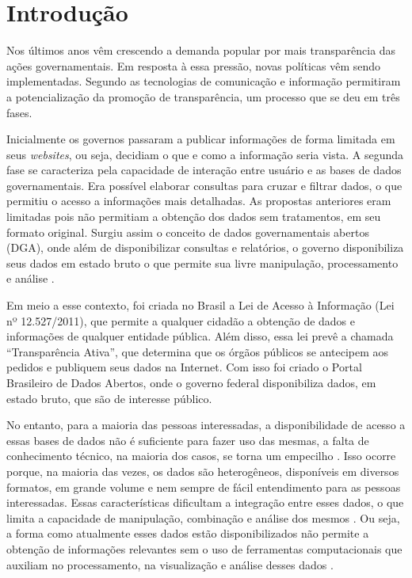 
\chapter{Introdução}
\label{chap:introducao}

Nos últimos anos vêm crescendo a demanda popular por mais transparência das ações 
governamentais. Em resposta à essa pressão, novas políticas vêm sendo implementadas. 
Segundo  as tecnologias de comunicação e informação permitiram a 
potencialização da promoção de transparência, um processo que se deu em três fases. 

Inicialmente os governos passaram a publicar informações de forma limitada em seus 
\textit{websites}, ou seja, decidiam o que e como a informação seria vista. A segunda fase 
se caracteriza pela capacidade de interação entre usuário e as bases de dados governamentais. 
Era possível elaborar consultas para cruzar e filtrar dados, o que permitiu o acesso a 
informações mais detalhadas. As propostas anteriores eram limitadas pois não permitiam a 
obtenção dos dados  sem tratamentos, em seu formato original. Surgiu assim o conceito de 
dados governamentais abertos (DGA), onde além de disponibilizar consultas e relatórios, o 
governo disponibiliza seus dados em estado bruto o que permite sua livre manipulação, 
processamento e análise \cite{vaz2010dados}.

Em meio a esse contexto, foi criada no Brasil a Lei de Acesso à Informação 
(Lei nº 12.527/2011), que permite a qualquer cidadão a obtenção de dados e informações 
de qualquer entidade pública. Além disso, essa lei prevê a chamada “Transparência Ativa”, 
que determina que os órgãos públicos se antecipem aos pedidos e publiquem seus dados na 
Internet. Com isso foi criado o Portal Brasileiro de Dados Abertos, onde o governo federal 
disponibiliza dados, em estado bruto, que são de interesse público. 

No entanto, para a maioria das pessoas interessadas, a disponibilidade de acesso a essas 
bases de dados não é suficiente para fazer uso das mesmas, a falta de conhecimento técnico, 
na maioria dos casos, se torna um empecilho \cite{graves2013}. Isso ocorre porque, na 
maioria das vezes, os dados são heterogêneos, disponíveis em diversos formatos, em grande 
volume e nem sempre de fácil entendimento para as pessoas interessadas. Essas características 
dificultam a integração entre esses dados, o que limita a capacidade de manipulação, 
combinação e análise dos mesmos \cite{hoxha2011open}. Ou seja, a forma como atualmente esses 
dados estão disponibilizados não permite a obtenção de informações relevantes sem o uso de 
ferramentas computacionais que auxiliam no processamento, na visualização e análise desses 
dados \cite{vaz2010dados}. 

